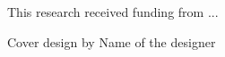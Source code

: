 \vspace*{1cm}
This research received funding from ...

\vspace*{\fill}
Cover design by Name of the designer